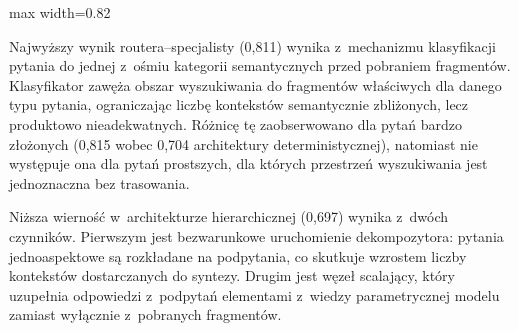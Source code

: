 \begin{wykres}[H]
  \caption{Wierność według architektury}\label{wykres:wiernosc-per-architektura}
  \centering
  \begin{adjustbox}{max width=0.82\textwidth}
  \end{adjustbox}
\end{wykres}

Najwyższy wynik routera--specjalisty (0{,}811) wynika z~mechanizmu klasyfikacji
pytania do jednej z~ośmiu kategorii semantycznych przed pobraniem fragmentów.
Klasyfikator zawęża obszar wyszukiwania do fragmentów właściwych dla danego
typu pytania, ograniczając liczbę kontekstów semantycznie zbliżonych, lecz
produktowo nieadekwatnych. Różnicę tę zaobserwowano dla pytań bardzo złożonych
(0{,}815 wobec 0{,}704 architektury deterministycznej), natomiast nie występuje
ona dla pytań prostszych, dla których przestrzeń wyszukiwania jest jednoznaczna
bez trasowania.

Niższa wierność w~architekturze hierarchicznej (0{,}697) wynika z~dwóch
czynników. Pierwszym jest bezwarunkowe uruchomienie dekompozytora: pytania
jednoaspektowe są rozkładane na podpytania, co skutkuje wzrostem liczby
kontekstów dostarczanych do syntezy. Drugim jest węzeł scalający, który
uzupełnia odpowiedzi z~podpytań elementami z~wiedzy parametrycznej modelu
zamiast wyłącznie z~pobranych fragmentów.

